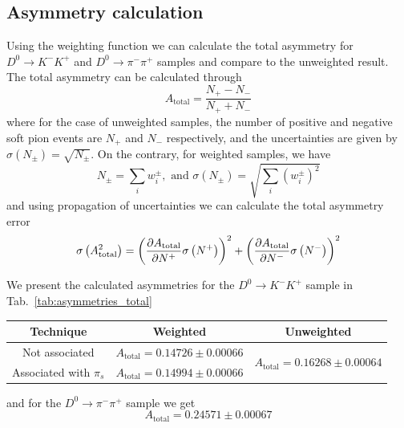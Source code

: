 \documentclass{article}
\begin{document}
        \pagebreak

        \subsection{Asymmetry calculation}
        Using the weighting function we can calculate the total asymmetry for $D^0\to K^-K^+$ and $D^0\to\pi^-\pi^+$ samples and compare to the unweighted result.
        The total asymmetry can be calculated through
        \begin{equation}
                A_\text{total} = \frac{N_+ - N_-}{N_+ + N_-}
        \end{equation}
        where for the case of unweighted samples, the number of positive and negative soft pion events are $N_+$ and $N_-$ respectively, and the uncertainties are given by $\sigma\left(N_\pm\right) = \sqrt{N_{\pm}}$.
        On the contrary, for weighted samples, we have
        \begin{equation}
                N_\pm = \sum_i w_i^\pm, \text{ and } \sigma\left(N_\pm\right) = \sqrt{\sum_i (w_i^\pm)^2}
        \end{equation} 
        and using propagation of uncertainties we can calculate the total asymmetry error
        \begin{equation}
                \sigma\left(A_{\text{total}} ^2\right) = \left(\pdv{A_{\text{total}}}{N^+}\sigma\left(N^+\right)\right)^2 + \left(\pdv{A_{\text{total}}}{N^-}\sigma\left(N^-\right)\right)^2
        \end{equation}

        We present the calculated asymmetries for the $D^0\to K^-K^+$ sample in Tab.~\ref{tab:asymmetries_total}
        \begin{center}
                \begin{tabular}{c|c|c}
                        Technique & Weighted & Unweighted\\
                        \hline\hline
                        Not associated & $A_\text{total} = 0.14726 \pm 0.00066$ & \multirow{2}{*}{$A_\text{total} = 0.16268 \pm 0.00064$}\\
                        \cline{1-2}
                        Associated with $\pi_s$ & $A_\text{total} = 0.14994 \pm 0.00066$ & \\
                \end{tabular}
                \label{tab:asymmetries_total}
        \end{center}
        and for the $D^0\to \pi^-\pi^+$ sample we get
        \begin{equation}
                A_\text{total} = 0.24571 \pm 0.00067
        \end{equation} 
\end{document}
